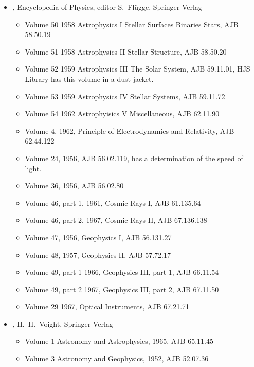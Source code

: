 \documentclass{article}
\begin{document}
\begin{itemize}
\item {}, Encyclopedia of Physics, editor
  S.\ Fl\"{u}gge, Springer-Verlag
  \begin{itemize}
  \item Volume 50 1958 Astrophysics I Stellar Surfaces Binaries Stars,
    AJB 58.50.19
  \item Volume 51 1958 Astrophysics II Stellar Structure, AJB 58.50.20
  \item Volume 52 1959 Astrophysics III The Solar System, AJB
    59.11.01, HJS Library has this volume in a dust jacket.
  \item Volume 53 1959 Astrophysics IV Stellar Systems, AJB 59.11.72
  \item Volume 54 1962 Astrophyisics V Miscellaneous, AJB 62.11.90

  \item Volume 4, 1962, Principle of Electrodynamics and Relativity,
    AJB 62.44.122
  \item Volume 24, 1956, AJB 56.02.119, has a determination of the
    speed of light.
  \item Volume 36, 1956, AJB 56.02.80
  \item Volume 46, part 1, 1961, Cosmic Rays I, AJB 61.135.64
  \item Volume 46, part 2, 1967, Cosmic Rays II, AJB 67.136.138
    \item Volume 47, 1956, Geophysics I, AJB 56.131.27
  \item Volume 48, 1957, Geophysics II, AJB 57.72.17
  \item Volume 49, part 1 1966, Geophysics III, part 1, AJB 66.11.54
  \item Volume 49, part 2 1967, Geophysics III, part 2, AJB 67.11.50
  \item Volume 29 1967, Optical Instruments, AJB 67.21.71
    
  \end{itemize}

\item {}, H.\ H.\ Voight,
  Springer-Verlag
  \begin{itemize}
  \item Volume 1 Astronomy and Astrophysics, 1965, AJB 65.11.45
  \item Volume 3 Astronomy and Geophysics, 1952, AJB 52.07.36
  \end{itemize}
  

\end{itemize}
\end{document}
